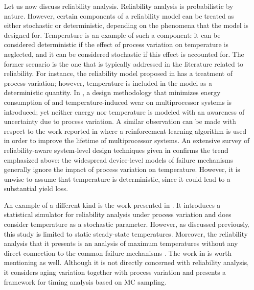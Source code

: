 Let us now discuss reliability analysis. Reliability analysis is probabilistic
by nature. However, certain components of a reliability model can be treated as
either stochastic or deterministic, depending on the phenomena that the model is
designed for. Temperature is an example of such a component: it can be
considered deterministic if the effect of process variation on temperature is
neglected, and it can be considered stochastic if this effect is accounted for.
The former scenario is the one that is typically addressed in the literature
related to reliability. For instance, the reliability model proposed in
\cite{xiang2010} has a treatment of process variation; however, temperature is
included in the model as a deterministic quantity. In \cite{das2014a}, a design
methodology that minimizes energy consumption of and temperature-induced wear on
multiprocessor systems is introduced; yet neither energy nor temperature is
modeled with an awareness of uncertainty due to process variation. A similar
observation can be made with respect to the work reported in \cite{das2014c}
where a reinforcement-learning algorithm is used in order to improve the
lifetime of multiprocessor systems. An extensive survey of reliability-aware
system-level design techniques given in \cite{das2014b} confirms the trend
emphasized above: the widespread device-level models of failure mechanisms
generally ignore the impact of process variation on temperature. However, it is
unwise to assume that temperature is deterministic, since it could lead to a
substantial yield loss.

An example of a different kind is the work presented in \cite{lee2013}. It
introduces a statistical simulator for reliability analysis under process
variation and does consider temperature as a stochastic parameter. However, as
discussed previously, this study is limited to static steady-state temperatures.
Moreover, the reliability analysis that it presents is an analysis of maximum
temperatures without any direct connection to the common failure mechanisms
\cite{jedec2016}. The work in \cite{kiamehr2016} is worth mentioning as well.
Although it is not directly concerned with reliability analysis, it considers
aging variation together with process variation and presents a framework for
timing analysis based on \ac{MC} sampling.

